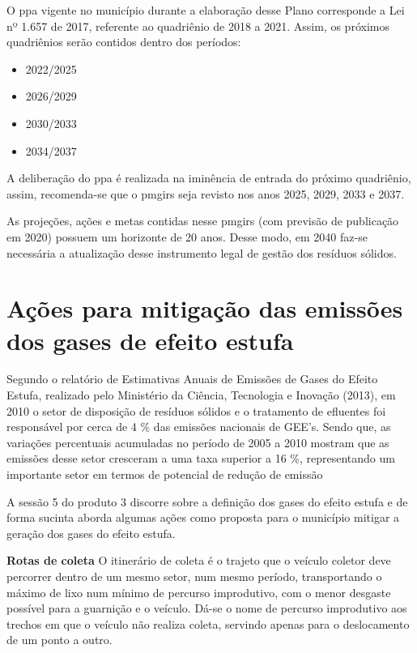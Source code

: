 O \gls{ppa} vigente no município durante a elaboração desse Plano corresponde a Lei nº 1.657 de 2017, referente ao quadriênio de 2018 a 2021. Assim, os próximos quadriênios serão contidos dentro dos períodos:

\begin{itemize}
	\item 2022/2025
	\item 2026/2029
	\item 2030/2033
	\item 2034/2037
\end{itemize}

A deliberação do \gls{ppa} é realizada na iminência de entrada do próximo quadriênio, assim, recomenda-se que o \gls{pmgirs} seja revisto nos anos 2025, 2029, 2033 e 2037.

As projeções, ações e metas contidas nesse \gls{pmgirs} (com previsão de publicação em 2020) possuem um horizonte de 20 anos. Desse modo, em 2040 faz-se necessária a atualização desse instrumento legal de gestão dos resíduos sólidos.

\FloatBarrier
\newpage
\section{Ações para mitigação das emissões dos gases de efeito estufa}
\label{sec:acoes_efeito_estufa}
Segundo o relatório de Estimativas Anuais de Emissões de Gases do Efeito Estufa, realizado pelo Ministério da Ciência, Tecnologia e Inovação (2013), em 2010 o setor de disposição de resíduos sólidos e o tratamento de efluentes foi responsável por cerca de 4 \% das emissões nacionais de GEE’s.
Sendo que, as variações percentuais acumuladas no período de 2005 a 2010 mostram que as emissões desse setor cresceram a uma taxa superior a 16 \%, representando um importante setor em termos de potencial de redução de emissão

A sessão 5 do produto 3 discorre sobre a definição dos gases do efeito estufa e de forma sucinta aborda algumas ações como proposta para o município mitigar a geração dos gases do efeito estufa. 

\textbf{Rotas de coleta}
O itinerário de coleta é o trajeto que o veículo coletor deve percorrer dentro de um mesmo setor, num mesmo período, transportando o máximo de lixo num mínimo de percurso improdutivo, com o menor desgaste possível para a guarnição e o veículo. Dá-se o nome de percurso improdutivo aos trechos em que o veículo não realiza coleta, servindo apenas para o deslocamento de um ponto a outro.\cite{dalmeida_manual_2018}

